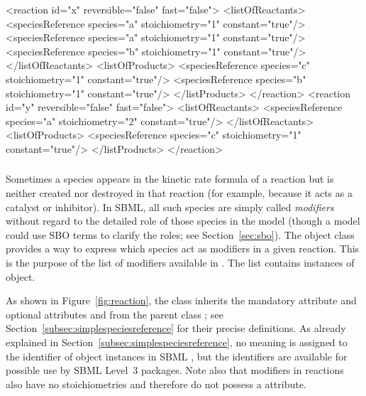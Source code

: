 \begin{example}

<reaction id="x" reversible="false" fast="false">
    <listOfReactants>
        <speciesReference species="a" stoichiometry="1" constant="true"/>
        <speciesReference species="a" stoichiometry="1" constant="true"/>
        <speciesReference species="b" stoichiometry="1" constant="true"/>
    </listOfReactants>
    <listOfProducts>
        <speciesReference species="c" stoichiometry="1" constant="true"/>
        <speciesReference species="b" stoichiometry="1" constant="true"/>
    </listProducts>
</reaction>
<reaction id="y" reversible="false" fast="false">
    <listOfReactants>
        <speciesReference species="a" stoichiometry="2" constant="true"/>
    </listOfReactants>
    <listOfProducts>
        <speciesReference species="c" stoichiometry="1" constant="true"/>
    </listProducts>
</reaction>

\end{example}



\subsubsection{}
\label{subsec:modifierreference}

Sometimes a species appears in the kinetic rate formula of a
reaction but is neither created nor destroyed in that reaction
(for example, because it acts as a catalyst or inhibitor).  In
SBML, all such species are simply called \emph{modifiers} without
regard to the detailed role of those species in the model (though
a model could use SBO terms to clarify the roles; see
Section~\ref{sec:sbo}).  The \Reaction object class provides a way
to express which species act as modifiers in a given reaction.
This is the purpose of the list of modifiers available in
\Reaction.  The list contains instances of
\ModifierSpeciesReference object.

As shown in Figure~\vref{fig:reaction}, the
\ModifierSpeciesReference class inherits the mandatory attribute
 and optional attributes  and
 from the parent class \SimpleSpeciesReference; see
Section~\ref{subsec:simplespeciesreference} for their precise
definitions.  As already explained in
Section~\ref{subsec:simplespeciesreference}, no meaning is
assigned to the identifier of \ModifierSpeciesReference object
instances in SBML \thisLV, but the identifiers are available for
possible use by SBML Level~3 packages.  Note also that modifiers
in reactions also have no stoichiometries and therefore do not
possess a  attribute.

